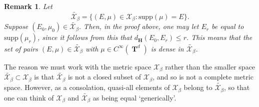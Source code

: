 \documentclass[dvipsnames,letterpaper,12pt]{article}
\numberwithin{equation}{section}
\DeclareMathOperator{\TT}{\mathbf{T}}
\newtheorem{remark}[theorem]{Remark}
\numberwithin{theorem}{section}
\begin{document}
\begin{remark} \label{remarkDOIWJDIOWJ2}
    Let
    \[ \tilde{\mathcal{X}_\beta} = \{ (E,\mu) \in \mathcal{X}_\beta : \text{supp}(\mu) = E \}. \]
    Suppose $(E_0,\mu_0) \in \tilde{\mathcal{X}_\beta}$. Then, in the proof above, one may let $E_r$ be equal to $\text{supp}(\mu_r)$, since it follows from this that $d_\mathbf{H}(E_0,E_r) \leq r$. This means that the set of pairs $(E,\mu) \in \tilde{\mathcal{X}_\beta}$ with $\mu \in C^\infty(\TT^d)$ is dense in $\tilde{\mathcal{X}_\beta}$.
\end{remark}

The reason we must work with the metric space $\mathcal{X}_\beta$ rather than the smaller space $\tilde{\mathcal{X}_\beta} \subset \mathcal{X}_\beta$ is that $\tilde{\mathcal{X}_\beta}$ is not a closed subset of $\mathcal{X}_\beta$, and so is not a complete metric space. However, as a consolation, quasi-all elements of $\mathcal{X}_\beta$ belong to $\tilde{\mathcal{X}_\beta}$, so that one can think of $\mathcal{X}_\beta$ and $\tilde{\mathcal{X}_\beta}$ as being equal `generically'.
\end{document}
